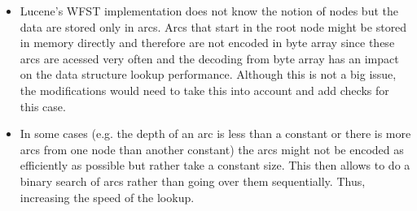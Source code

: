 \begin{itemize}
\begin{figure}[htbp]
        \caption{Comparison of memory usage when changing number encoding}
        \label{enc_comp}
    \end{figure}

    The memory usage increased by approximately $22\%$ for \textit{English words} dataset. However, it can be
    almost doubled as can be seen on \textit{Linux kernel} dataset where approximately $92\%$ size increase can be noted.
    The graph \ref{enc_comp} also shows the case when the encoding would use \textit{long} datatype. Although Lucene's \textit{Lookup}
    interface specificies \textit{long} datatype, WFST implementation supports only \textit{int} so far.

    \item Lucene's WFST implementation does not know the notion of nodes but the data are stored only in arcs. Arcs that
    start in the root node might be stored in memory directly and therefore are not encoded in byte array since these
    arcs are acessed very often
    and the decoding from byte array has an impact on the data structure lookup performance. Although this is not a big issue,
    the modifications would need to take this into account and add checks for this case.

    \item In some cases (e.g. the depth of an arc is less than a constant or there is more arcs from one node than
    another constant) the arcs
    might not be encoded as efficiently as possible but rather take a constant size. This then allows to do a binary
    search of arcs rather than going over them sequentially. Thus, increasing the speed of the lookup.


\end{itemize}
